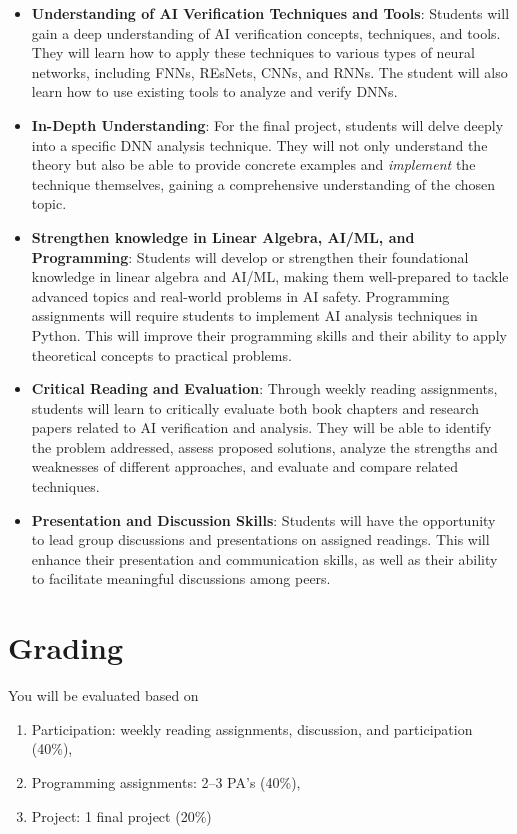 \documentclass[11pt]{article}
\begin{document}
\begin{itemize}
\item \textbf{Understanding of AI Verification Techniques and Tools}: Students will gain a deep understanding of AI verification concepts, techniques, and tools. They will learn how to apply these techniques to various types of neural networks, including FNNs, REsNets, CNNs, and RNNs.  The student will also learn how to use existing tools to analyze and verify DNNs.

\item \textbf{In-Depth Understanding}: For the final project, students will delve deeply into a specific DNN analysis technique. They will not only understand the theory but also be able to provide concrete examples and \emph{implement} the technique themselves, gaining a comprehensive understanding of the chosen topic.  

\item \textbf{Strengthen knowledge in Linear Algebra, AI/ML, and Programming}: Students will develop or strengthen their foundational knowledge in linear algebra and AI/ML, making them well-prepared to tackle advanced topics and real-world problems in AI safety. 
Programming assignments will require students to implement AI analysis techniques in Python. This will improve their programming skills and their ability to apply theoretical concepts to practical problems.


\item \textbf{Critical Reading and Evaluation}: Through weekly reading assignments, students will learn to critically evaluate both book chapters and research papers related to AI verification and analysis. They will be able to identify the problem addressed, assess proposed solutions, analyze the strengths and weaknesses of different approaches, and evaluate and compare related techniques.

\item \textbf{Presentation and Discussion Skills}: Students will have the opportunity to lead group discussions and presentations on assigned readings. This will enhance their presentation and communication skills, as well as their ability to facilitate meaningful discussions among peers.

\end{itemize}

\section{Grading}
You will be evaluated based on
\begin{enumerate}
\item Participation:  weekly reading assignments, discussion, and participation (40\%),
\item Programming assignments: 2--3 PA's (40\%),
\item Project: 1 final project  (20\%)
\end{enumerate}
\end{document}
